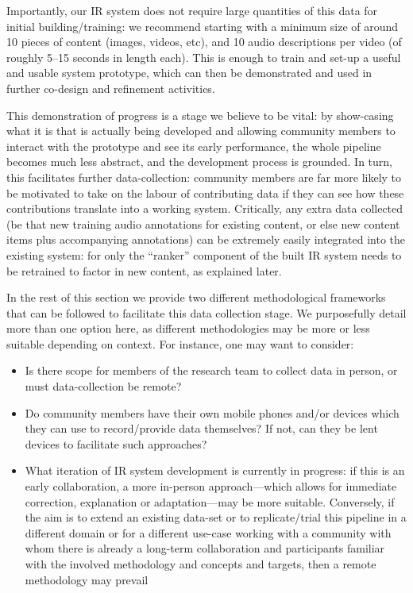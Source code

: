\documentclass[10pt,twoside,openright]{report}
\begin{document}
Importantly, our IR system does not require large quantities of this data for initial building/training: we recommend starting with a minimum size of around 10 pieces of content (images, videos, etc), and 10 audio descriptions per video (of roughly 5--15 seconds in length each).
This is enough to train and set-up a useful and usable system prototype, which can then be demonstrated and used in further co-design and refinement activities.

This demonstration of progress is a stage we believe to be vital: by show-casing what it is that is actually being developed and allowing community members to interact with the prototype and see its early performance, the whole pipeline becomes much less abstract, and the development process is grounded.
In turn, this facilitates further data-collection: community members are far more likely to be motivated to take on the labour of contributing data if they can see how these contributions translate into a working system.
Critically, any extra data collected (be that new training audio annotations for existing content, or else new content items plus accompanying annotations) can be extremely easily integrated into the existing system: for only the ``ranker'' component of the built IR system needs to be retrained to factor in new content, as explained later.

In the rest of this section we provide two different methodological frameworks that can be followed to facilitate this data collection stage.
We purposefully detail more than one option here, as different methodologies may be more or less suitable depending on context.
For instance, one may want to consider: 
\begin{itemize}
    \item Is there scope for members of the research team to collect data in person, or must data-collection be remote?
    \item Do community members have their own mobile phones and/or devices which they can use to record/provide data themselves? If not, can they be lent devices to facilitate such approaches?
    \item  What iteration of IR system development is currently in progress: if this is an early collaboration, a more in-person approach---which allows for immediate correction, explanation or adaptation---may be more suitable. Conversely, if the aim is to extend an existing data-set or to replicate/trial this pipeline in a different domain or for a different use-case working with a community with whom there is already a long-term collaboration and participants familiar with the involved methodology and concepts and targets, then a remote methodology may prevail
\end{itemize}
\end{document}
